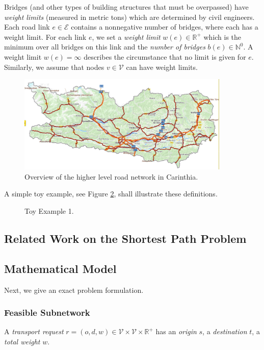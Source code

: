Bridges (and other types of building structures that must be overpassed)
have \emph{weight limits} (measured in metric tons) which are determined by civil engineers.
Each road link $e \in \mathcal{E}$ contains a nonnegative number of bridges, where each has a weight limit.
For each link $e$, we set a \emph{weight limit} $w(e) \in \mathbb{R}^{+}$ which is the
minimum over all bridges on this link and the \emph{number of bridges} $b(e) \in \mathbb{N}^{0}$.
A weight limit $w(e)= \infty$ describes the circumstance
that no limit is given for $e$.
Similarly, we assume that nodes $v \in \mathcal{V}$ can have weight limits.
\begin{figure}[!ht]
  \centering
  \includegraphics[width=0.9\textwidth]{map.jpg}
  \caption{Overview of the higher level road network in Carinthia.}
  \label{fig:higher level}
\end{figure}


A simple toy example, see Figure \ref{fig_toy_example_1}, shall illustrate these definitions.
\begin{figure}[!ht]
  \centering
  
  \caption{Toy Example 1.}
  \label{fig_toy_example_1}
\end{figure}


\subsection{Related Work on the Shortest Path Problem}

\citet{TACCARI2016122, zhu2014vehicle, Osegueda.1999}

\subsection{Mathematical Model}

Next, we give an exact problem formulation.

\subsubsection{Feasible Subnetwork}
A \emph{transport request} $r=(o,d,w) \in \mathcal{V} \times \mathcal{V} \times \mathbb{R}^{+}$
has an \emph{origin} $s$, a \emph{destination} $t$, a \emph{total weight} $w$.

